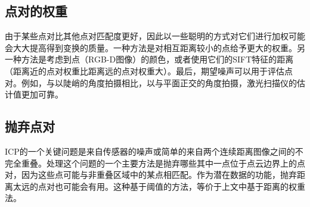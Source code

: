 
\subsection {点对的权重}
由于某些点对比其他点对匹配度更好，因此以一些聪明的方式对它们进行加权可能会大大提高得到变换的质量。一种方法是对相互距离较小的点给予更大的权重。另一种方法是考虑到点（RGB-D图像）的颜色，或者使用它们的SIFT特征的距离（距离近的点对权重比距离远的点对权重大）。最后，期望噪声可以用于评估点对。例如，与以陡峭的角度拍摄相比，以与平面正交的角度拍摄，激光扫描仪的估计值更加可靠。


\subsection{抛弃点对}
ICP的一个关键问题是来自传感器的噪声或简单的来自两个连续距离图像之间的不完全重叠。处理这个问题的一个主要方法是抛弃哪些其中一点位于点云边界上的点对，因为这些点可能与非重叠区域中的某点相匹配。作为潜在数据的功能，抛弃距离太远的点对也可能会有用。这种基于阈值的方法，等价于上文中基于距离的权重法。

